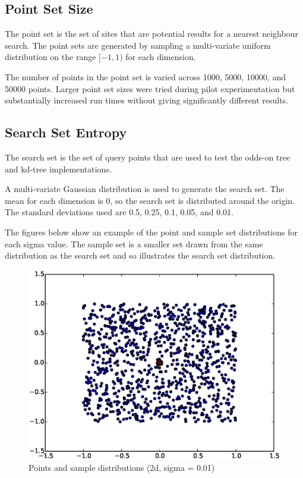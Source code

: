 \documentclass[mcs]{scsthesis}
\begin{document}
\subsection{Point Set Size}

The point set is the set of sites that are potential results for a nearest
neighbour search. The point sets are generated by sampling a multi-variate
uniform distribution on the range \([-1, 1)\) for each dimension.

The number of points in the point set is varied across 1000, 5000, 10000, and
50000 points. Larger point set sizes were tried during pilot experimentation but
substantially increased run times without giving significantly different
results.

\subsection{Search Set Entropy}

The search set is the set of query points that are used to test the odds-on
tree and kd-tree implementations.

A multi-variate Gaussian distribution is used to generate the search set. The
mean for each dimension is 0, so the search set is distributed around the
origin. The standard deviations used are 0.5, 0.25, 0.1, 0.05, and 0.01.

The figures below show an example of the point and sample set distributions for
each sigma value. The sample set is a smaller set drawn from the same
distribution as the search set and so illustrates the search set distribution.

\begin{figure}
\begin{center}
\includegraphics[scale=0.5]{diagrams/pts_plot_sigma0.01.eps}
\caption{Points and sample distributions (2d, sigma = 0.01)}
\label{fig:points_and_sample_2d_0_01}
\end{center}
\end{figure}
\end{document}
